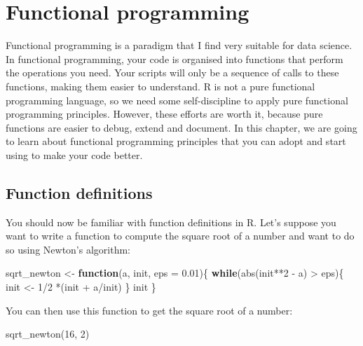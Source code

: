 \documentclass[
]{article}
\newenvironment{Shaded}{\begin{snugshade}}{\end{snugshade}}
\newcommand{\AttributeTok}[1]{\textcolor[rgb]{0.77,0.63,0.00}{#1}}
\newcommand{\ControlFlowTok}[1]{\textcolor[rgb]{0.13,0.29,0.53}{\textbf{#1}}}
\newcommand{\DecValTok}[1]{\textcolor[rgb]{0.00,0.00,0.81}{#1}}
\newcommand{\FloatTok}[1]{\textcolor[rgb]{0.00,0.00,0.81}{#1}}
\newcommand{\FunctionTok}[1]{\textcolor[rgb]{0.00,0.00,0.00}{#1}}
\newcommand{\NormalTok}[1]{#1}
\newcommand{\OtherTok}[1]{\textcolor[rgb]{0.56,0.35,0.01}{#1}}
\newcommand{\SpecialCharTok}[1]{\textcolor[rgb]{0.00,0.00,0.00}{#1}}
\begin{document}
\hypertarget{functional-programming}{%
\section{Functional programming}\label{functional-programming}}

Functional programming is a paradigm that I find very suitable for data science. In functional
programming, your code is organised into functions that perform the operations you need. Your scripts
will only be a sequence of calls to these functions, making them easier to understand. R is not a pure
functional programming language, so we need some self-discipline to apply pure functional programming
principles. However, these efforts are worth it, because pure functions are easier to debug, extend
and document. In this chapter, we are going to learn about functional programming principles that you
can adopt and start using to make your code better.

\hypertarget{function-definitions}{%
\subsection{Function definitions}\label{function-definitions}}

You should now be familiar with function definitions in R. Let's suppose you want to write a function
to compute the square root of a number and want to do so using Newton's algorithm:

\begin{Shaded}
\begin{Highlighting}[]
\NormalTok{sqrt\_newton }\OtherTok{\textless{}{-}} \ControlFlowTok{function}\NormalTok{(a, init, }\AttributeTok{eps =} \FloatTok{0.01}\NormalTok{)\{}
    \ControlFlowTok{while}\NormalTok{(}\FunctionTok{abs}\NormalTok{(init}\SpecialCharTok{**}\DecValTok{2} \SpecialCharTok{{-}}\NormalTok{ a) }\SpecialCharTok{\textgreater{}}\NormalTok{ eps)\{}
\NormalTok{        init }\OtherTok{\textless{}{-}} \DecValTok{1}\SpecialCharTok{/}\DecValTok{2} \SpecialCharTok{*}\NormalTok{(init }\SpecialCharTok{+}\NormalTok{ a}\SpecialCharTok{/}\NormalTok{init)}
\NormalTok{    \}}
\NormalTok{    init}
\NormalTok{\}}
\end{Highlighting}
\end{Shaded}

You can then use this function to get the square root of a number:

\begin{Shaded}
\begin{Highlighting}[]
\FunctionTok{sqrt\_newton}\NormalTok{(}\DecValTok{16}\NormalTok{, }\DecValTok{2}\NormalTok{)}
\end{Highlighting}
\end{Shaded}
\end{document}
